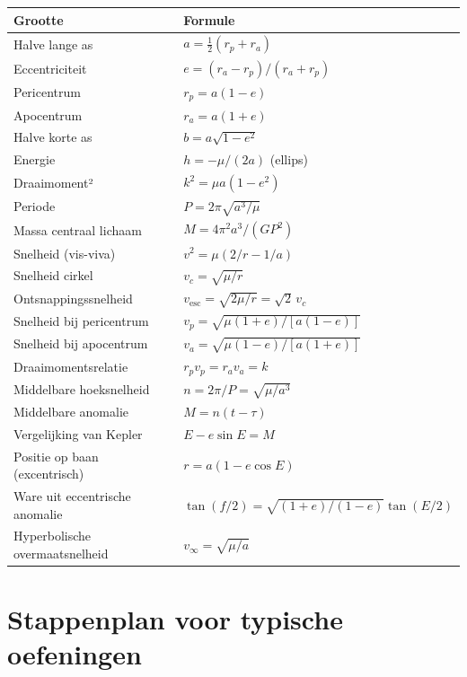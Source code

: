 \documentclass[11pt, a4paper]{article}
\begin{document}
\begin{center}
\renewcommand{\arraystretch}{1.6}
\begin{tabular}{p{5.5cm} p{8cm}}
\toprule
\textbf{Grootte} & \textbf{Formule} \\
\midrule
Halve lange as & $a = \tfrac{1}{2}(r_p + r_a)$ \\
Eccentriciteit & $e = (r_a - r_p)/(r_a + r_p)$ \\
Pericentrum & $r_p = a(1-e)$ \\
Apocentrum  & $r_a = a(1+e)$ \\
Halve korte as & $b = a\sqrt{1-e^2}$ \\
Energie & $h = -\mu/(2a)$ \quad (ellips) \\
Draaimoment² & $k^2 = \mu a(1-e^2)$ \\
Periode & $P = 2\pi\sqrt{a^3/\mu}$ \\
Massa centraal lichaam & $M = 4\pi^2 a^3/(GP^2)$ \\
Snelheid (vis-viva) & $v^2 = \mu(2/r - 1/a)$ \\
Snelheid cirkel & $v_c = \sqrt{\mu/r}$ \\
Ontsnappingssnelheid & $v_\mathrm{esc} = \sqrt{2\mu/r} = \sqrt{2}\,v_c$ \\
Snelheid bij pericentrum & $v_p = \sqrt{\mu(1+e)/[a(1-e)]}$ \\
Snelheid bij apocentrum & $v_a = \sqrt{\mu(1-e)/[a(1+e)]}$ \\
Draaimomentsrelatie & $r_p v_p = r_a v_a = k$ \\
Middelbare hoeksnelheid & $n = 2\pi/P = \sqrt{\mu/a^3}$ \\
Middelbare anomalie & $M = n(t-\tau)$ \\
Vergelijking van Kepler & $E - e\sin E = M$ \\
Positie op baan (excentrisch) & $r = a(1 - e\cos E)$ \\
Ware uit eccentrische anomalie & $\tan(f/2) = \sqrt{(1+e)/(1-e)}\tan(E/2)$ \\
Hyperbolische overmaatsnelheid & $v_\infty = \sqrt{\mu/a}$ \\
\bottomrule
\end{tabular}
\end{center}

\section{Stappenplan voor typische oefeningen}
\end{document}
